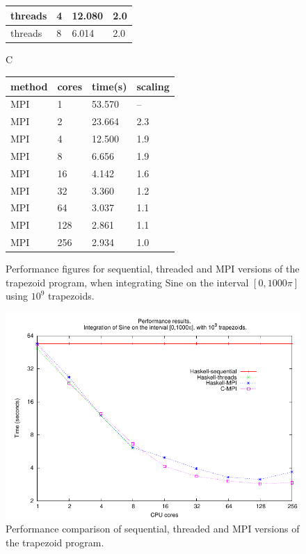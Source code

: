 \documentclass{tmr}
\begin{document}
\begin{figure}
\begin{minipage}[t]{0.5\linewidth}
\begin{tabular}{|l|l|l|l|}
threads & 4    & 12.080  & 2.0 \\ \hline
threads & 8    & 6.014  &  2.0 \\ \hline
\end{tabular}
\end{minipage}
\begin{minipage}[t]{0.5\linewidth}
\centering
C \\[3mm]
\begin{tabular}{|l|l|l|l|} \hline
method & cores & time(s) & scaling \\ \hline\hline
MPI & 1      & 53.570  & -- \\ \hline
MPI & 2      & 23.664  & 2.3 \\ \hline
MPI & 4      & 12.500  & 1.9 \\ \hline
MPI & 8      &  6.656  & 1.9 \\ \hline
MPI & 16     &  4.142  & 1.6 \\ \hline
MPI & 32     &  3.360  & 1.2 \\ \hline
MPI & 64     &  3.037  & 1.1 \\ \hline
MPI & 128    &  2.861  & 1.1 \\ \hline
MPI & 256    &  2.934  & 1.0 \\ \hline
\end{tabular}
\end{minipage}
\vspace{3mm}
\caption{Performance figures for sequential, threaded and MPI versions of the trapezoid program,
when integrating Sine on the interval $[0,1000 \pi]$ using $10^9$ trapezoids. \label{TiminigTable}}
\end{figure}

\begin{figure}
\centering
\includegraphics{performance.pdf}
\vspace{3mm}
\caption{Performance comparison of sequential, threaded and MPI versions of the trapezoid program.
\label{PerformanceGraph}}
\end{figure}
\end{document}
